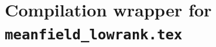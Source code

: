 \documentclass[11pt]{article}
\newcommand{\1}{\mathbbm{1}}
\begin{document}
\section*{Compilation wrapper for \texttt{meanfield\_lowrank.tex}}


\end{document}
